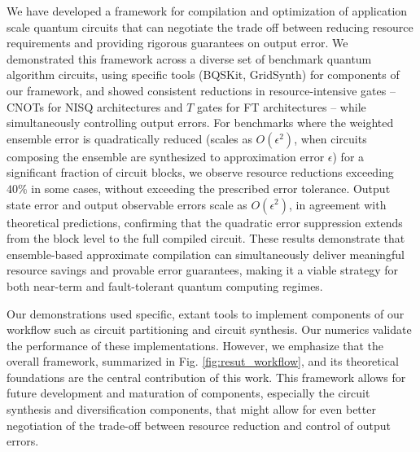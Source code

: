 We have developed a framework for compilation and optimization of application scale quantum circuits that can negotiate the trade off between reducing resource requirements and providing rigorous guarantees on output error. We demonstrated this framework across a diverse set of benchmark quantum algorithm circuits, using specific tools (\eg BQSKit, GridSynth) for components of our framework, and showed consistent reductions in resource-intensive gates -- CNOTs for NISQ architectures and $T$ gates for FT architectures -- while simultaneously controlling output errors.  
For benchmarks where the weighted ensemble error is quadratically reduced (\ie scales as $O(\epsilon^2)$, when circuits composing the ensemble are synthesized to approximation error $\epsilon$) for a significant fraction of circuit blocks, we observe resource reductions exceeding $40\%$ in some cases, without exceeding the prescribed error tolerance.  
Output state error and output observable errors scale as $O(\epsilon^2)$, in agreement with theoretical predictions, confirming that the quadratic error suppression extends from the block level to the full compiled circuit.  
These results demonstrate that ensemble-based approximate compilation can simultaneously deliver meaningful resource savings and provable error guarantees, making it a viable strategy for both near-term and fault-tolerant quantum computing regimes.

Our demonstrations used specific, extant tools to implement components of our workflow such as circuit partitioning and circuit synthesis. Our numerics validate the performance of these implementations. However, we emphasize that the overall framework, summarized in Fig. \ref{fig:resut_workflow}, and its theoretical foundations are the central contribution of this work. This framework allows for future development and maturation of components, especially the circuit synthesis and diversification components, that might allow for even better negotiation of the trade-off between resource reduction and control of output errors. 